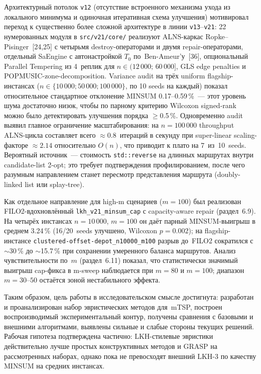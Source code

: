 \documentclass[14pt,a4paper]{extarticle}
\newcommand{\source}[1]{[#1]}
\begin{document}
Архитектурный потолок \texttt{v12} (отсутствие встроенного механизма ухода из локального минимума и одиночная итеративная схема улучшения) мотивировал переход к существенно более сложной архитектуре в линии \texttt{v13}--\texttt{v21}: 22 нумерованных модуля в \texttt{src/v21/core/} реализуют ALNS-каркас Ropke--Pisinger~\source{24,25} с четырьмя destroy-операторами и двумя repair-операторами, отдельный SaEngine с автонастройкой $T_0$ по~Ben-Ameur'у~\source{36}, опциональный Parallel Tempering из 4~реплик для $n \in (12\,000;\,60\,000]$, GLS edge penalties и POPMUSIC-zone-decomposition. Variance audit на трёх uniform flagship-инстансах ($n \in \{10\,000; 50\,000; 100\,000\}$, по 10 seeds на каждый) показал относительное стандартное отклонение MINSUM 0.17--0.59\,\%~--- этот уровень шума достаточно низок, чтобы по парному критерию Wilcoxon signed-rank можно было детектировать улучшения порядка $\geq$0.5\,\%. Одновременно audit выявил главное ограничение масштабирования: на $n=100\,000$ throughput ALNS-цикла составляет всего $\approx$0.8~итераций в секунду при super-linear scaling-факторе $\approx 2.14$ относительно $O(n)$, что приводит к плато на 7~из~10~seeds. Вероятный источник~--- стоимость \texttt{std::reverse} на длинных маршрутах внутри candidate-list 2-opt; это требует подтверждения профилированием, после чего разумным направлением станет пересмотр представления маршрута (doubly-linked list или splay-tree).

Как отдельное направление для high-m сценариев ($m=100$) был реализован FILO2-вдохновлённый \texttt{lkh\_v21\_minsum\_cap} с capacity-aware repair (раздел~6.9). На четырёх инстансах $n=10\,000$, $m=100$ он даёт парный MINSUM-выигрыш в среднем 3.24\,\% (16/20~seeds улучшено, Wilcoxon $p = 0.002$); на flagship-инстансе \texttt{clustered-offset-depot\_n10000\_m100} разрыв до~FILO2 сократился с $\sim$30\,\% до $\sim$15.7\,\% при сохранении умеренного баланса маршрутов. Анализ чувствительности по~$m$ (раздел~6.11) показал, что статистически значимый выигрыш cap-фикса в m-sweep наблюдается при $m=80$ и $m=100$; диапазон $m=30$--$50$ остаётся зоной нестабильного эффекта.

Таким образом, цель работы в исследовательском смысле достигнута: разработан и проанализирован набор эвристических методов для~mTSP, построен воспроизводимый экспериментальный контур, получены сравнения с базовыми и внешними алгоритмами, выявлены сильные и слабые стороны текущих решений. Рабочая гипотеза подтверждена частично: LKH-стилевые эвристики действительно лучше простых конструктивных методов и GRASP на рассмотренных наборах, однако пока не превосходят внешний LKH-3 по качеству MINSUM на средних инстансах.
\end{document}
